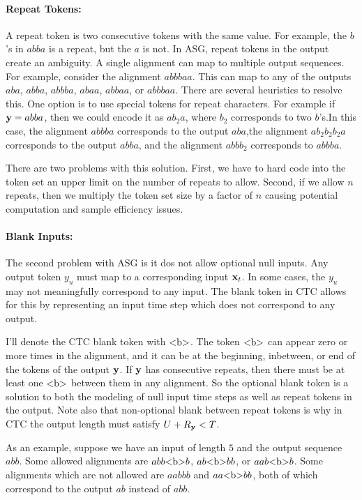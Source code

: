 \paragraph{Repeat Tokens:} A repeat token is two consecutive tokens with the
same value. For example, the $b$'s in $abba$ is a repeat, but the $a$ is not.
In ASG, repeat tokens in the output create an ambiguity. A single alignment can
map to multiple output sequences. For example, consider the alignment $abbbaa$.
This can map to any of the outputs $aba$, $abba$, $abbba$, $abaa$, $abbaa$, or
$abbbaa$. There are several heuristics to resolve this. One option is to use
special tokens for repeat characters. For example if ${\bf y} = abba$, then we
could encode it as $ab_2a$, where $b_2$ corresponds to two $b$'s.In this case,
the alignment $abbba$ corresponds to the output $aba$,the alignment
$ab_2b_2b_2a$ corresponds to the output $abba$, and the alignment $abbb_2$
corresponds to $abbba$.

There are two problems with this solution. First, we have to hard code into the
token set an upper limit on the number of repeats to allow. Second, if we allow
$n$ repeats, then we multiply the token set size by a factor of $n$ causing
potential computation and sample efficiency issues.

\paragraph{Blank Inputs:} The second problem with ASG is it dos not allow
optional null inputs. Any output token $y_u$ must map to a corresponding input
${\bf x}_t$. In some cases, the $y_u$ may not meaningfully correspond to any input.
The blank token in CTC allows for this by representing an input time step which
does not correspond to any output.

I'll denote the CTC blank token with $\textrm{<b>}$. The token $\textrm{<b>}$ can appear
zero or more times in the alignment, and it can be at the beginning, inbetween,
or end of the tokens of the output ${\bf y}$. If ${\bf y}$ has consecutive repeats,
then there must be at least one $\textrm{<b>}$ between them in any alignment. So the
optional blank token is a solution to both the modeling of null input time
steps as well as repeat tokens in the output. Note also that non-optional blank
between repeat tokens is why in CTC the output length must satisfy $U + R_{\bf y} <
T$.

As an example, suppose we have an input of length $5$ and the output sequence
$abb$. Some allowed alignments are $abb \textrm{<b>} b$, $ab \textrm{<b>} bb$, or $aa b
\textrm{<b>} b$. Some alignments which are not allowed are $aabbb$ and $aa\textrm{<b>} b
b$, both of which correspond to the output $ab$ instead of $abb$.

